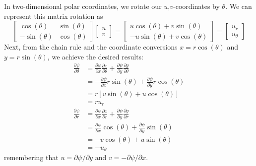 \documentclass[a4paper]{article}
\begin{document}
In two-dimensional polar coordinates, we rotate our \( u \),\( v \)-coordinates by \( \theta \). We can represent this matrix rotation as 
\[
	\begin{bmatrix}
		\cos\!\left(\theta\right) & \sin\!\left(\theta\right) \\
		-\sin\!\left(\theta\right) & \cos\!\left(\theta\right)
	\end{bmatrix}
	\begin{bmatrix}
		u \\
		v
	\end{bmatrix}
	=
	\begin{bmatrix}
		u \cos\!\left(\theta\right) + v \sin\!\left(\theta\right) \\
		-u \sin\!\left(\theta\right) + v \cos\!\left(\theta\right)
	\end{bmatrix}
	=
	\begin{bmatrix}
		u_{r} \\
		u_{\theta}
	\end{bmatrix}
\]
Next, from the chain rule and the coordinate conversions \( x = r \cos\!\left(\theta\right) \) and \( y = r \sin\!\left(\theta\right) \), we achieve the desired results:
\begin{align*}
	\frac{\partial \psi}{\partial \theta} & = \frac{\partial \psi}{\partial x}\frac{\partial x}{\partial \theta} + \frac{\partial \psi}{\partial y}\frac{\partial y}{\partial \theta} \\
					      & = -\frac{\partial \psi}{\partial x}r \sin\!\left(\theta\right) + \frac{\partial \psi}{\partial y}r \cos\!\left(\theta\right) \\
					      & = r \!\left[ v \sin\!\left(\theta\right) + u \cos\!\left(\theta\right) \right] \\
					      & = ru_{r} \\
	\frac{\partial \psi}{\partial r} & = \frac{\partial \psi}{\partial x}\frac{\partial x}{\partial r} + \frac{\partial \psi}{\partial y}\frac{\partial y}{\partial r} \\ 
					 & = \frac{\partial \psi}{\partial x}\cos\!\left(\theta\right) + \frac{\partial \psi}{\partial y}\sin\!\left(\theta\right) \\
					 & = -v \cos\!\left(\theta\right) + u \sin\!\left(\theta\right) \\
					 & = -u_{\theta}
\end{align*}
remembering that \( u = \partial \psi / \partial y \) and \( v = -\partial \psi / \partial x \).

\vspace{12pt}
\end{document}
